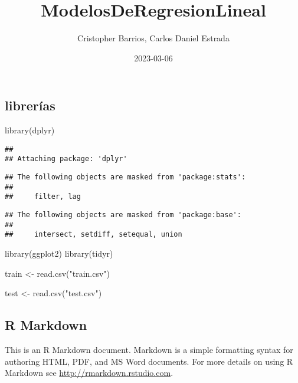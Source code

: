 \documentclass[
]{article}
\title{ModelosDeRegresionLineal}
\author{Cristopher Barrios, Carlos Daniel Estrada}
\date{2023-03-06}
\newenvironment{Shaded}{\begin{snugshade}}{\end{snugshade}}
\newcommand{\FunctionTok}[1]{\textcolor[rgb]{0.00,0.00,0.00}{#1}}
\newcommand{\NormalTok}[1]{#1}
\newcommand{\OtherTok}[1]{\textcolor[rgb]{0.56,0.35,0.01}{#1}}
\newcommand{\StringTok}[1]{\textcolor[rgb]{0.31,0.60,0.02}{#1}}
\begin{document}
\maketitle

\hypertarget{libreruxedas}{%
\subsection{librerías}\label{libreruxedas}}

\begin{Shaded}
\begin{Highlighting}[]
\FunctionTok{library}\NormalTok{(dplyr)}
\end{Highlighting}
\end{Shaded}

\begin{verbatim}
## 
## Attaching package: 'dplyr'
\end{verbatim}

\begin{verbatim}
## The following objects are masked from 'package:stats':
## 
##     filter, lag
\end{verbatim}

\begin{verbatim}
## The following objects are masked from 'package:base':
## 
##     intersect, setdiff, setequal, union
\end{verbatim}

\begin{Shaded}
\begin{Highlighting}[]
\FunctionTok{library}\NormalTok{(ggplot2)}
\FunctionTok{library}\NormalTok{(tidyr)}

\NormalTok{train }\OtherTok{\textless{}{-}} \FunctionTok{read.csv}\NormalTok{(}\StringTok{"train.csv"}\NormalTok{)}

\NormalTok{test }\OtherTok{\textless{}{-}} \FunctionTok{read.csv}\NormalTok{(}\StringTok{"test.csv"}\NormalTok{)}
\end{Highlighting}
\end{Shaded}

\hypertarget{r-markdown}{%
\subsection{R Markdown}\label{r-markdown}}

This is an R Markdown document. Markdown is a simple formatting syntax
for authoring HTML, PDF, and MS Word documents. For more details on
using R Markdown see \url{http://rmarkdown.rstudio.com}.
\end{document}
